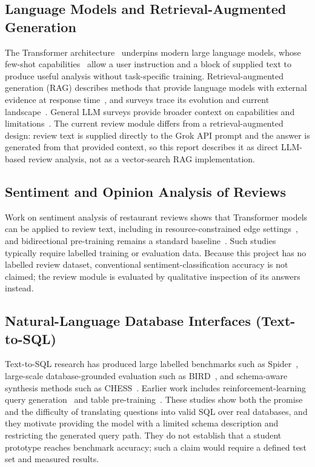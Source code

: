 \documentclass[12pt,a4paper]{report}
\begin{document}
\subsection{Language Models and Retrieval-Augmented Generation}
The Transformer architecture~\cite{ref3} underpins modern large language models, whose few-shot capabilities~\cite{ref4} allow a user instruction and a block of supplied text to produce useful analysis without task-specific training. Retrieval-augmented generation (RAG) describes methods that provide language models with external evidence at response time~\cite{ref5}, and surveys trace its evolution and current landscape~\cite{ref10}. General LLM surveys provide broader context on capabilities and limitations~\cite{ref13}. The current review module differs from a retrieval-augmented design: review text is supplied directly to the Grok API prompt and the answer is generated from that provided context, so this report describes it as direct LLM-based review analysis, not as a vector-search RAG implementation.

\subsection{Sentiment and Opinion Analysis of Reviews}
Work on sentiment analysis of restaurant reviews shows that Transformer models can be applied to review text, including in resource-constrained edge settings~\cite{ref11}, and bidirectional pre-training remains a standard baseline~\cite{ref12}. Such studies typically require labelled training or evaluation data. Because this project has no labelled review dataset, conventional sentiment-classification accuracy is not claimed; the review module is evaluated by qualitative inspection of its answers instead.

\subsection{Natural-Language Database Interfaces (Text-to-SQL)}
Text-to-SQL research has produced large labelled benchmarks such as Spider~\cite{ref6}, large-scale database-grounded evaluation such as BIRD~\cite{ref14}, and schema-aware synthesis methods such as CHESS~\cite{ref15}. Earlier work includes reinforcement-learning query generation~\cite{ref16} and table pre-training~\cite{ref17}. These studies show both the promise and the difficulty of translating questions into valid SQL over real databases, and they motivate providing the model with a limited schema description and restricting the generated query path. They do not establish that a student prototype reaches benchmark accuracy; such a claim would require a defined test set and measured results.
\end{document}
